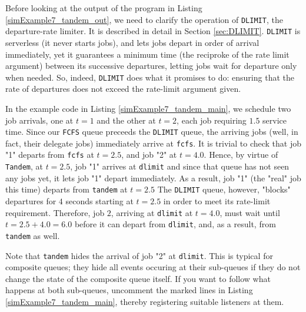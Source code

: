 \documentclass[12pt]{book}
\begin{document}
Before looking at the output of the program in
  Listing \ref{simExample7_tandem_out},
  we need to clarify the operation of \lstinline|DLIMIT|,
  the departure-rate limiter.
It is described in detail in Section \ref{sec:DLIMIT}.
\lstinline|DLIMIT| is serverless (it never starts jobs),
  and lets jobs depart in order of arrival immediately,
  yet it guarantees a minimum time (the reciproke of the rate limit argument)
  between its successive departures,
  letting jobs wait for departure only when needed.
So, indeed, \lstinline|DLIMIT| does what it promises to do:
  ensuring that the rate of departures does not exceed the
  rate-limit argument given.

In the example code in Listing \ref{simExample7_tandem_main},
  we schedule two job arrivals,
  one at $t=1$ and the other at $t=2$,
  each job requiring $1.5$ service time.
Since our \lstinline|FCFS| queue preceeds the \lstinline|DLIMIT|
  queue, the arriving jobs (well, in fact, their delegate jobs)
  immediately arrive at \lstinline|fcfs|.
It is trivial to check that job "1"
  departs from \lstinline|fcfs| at $t=2.5$,
  and job "2" at $t=4.0$.
Hence,
  by virtue of \lstinline|Tandem|,
  at $t=2.5$,
  job "1" arrives at \lstinline|dlimit|
  and since that queue has not seen any jobs yet,
  it lets job "1" depart immediately.
As a result,
  job "1" (the "real" job this time)
  departs from \lstinline|tandem| at $t=2.5$
The \lstinline|DLIMIT| queue, however,
  "blocks" departures for $4$ seconds
  starting at $t=2.5$
  in order to meet its rate-limit requirement.
Therefore, job $2$, arriving at \lstinline|dlimit|
  at $t=4.0$,
  must wait until $t=2.5+4.0=6.0$ before
  it can depart from \lstinline|dlimit|,
  and, as a result, from \lstinline|tandem| as well.

Note that \lstinline|tandem| hides
  the arrival of job "2" at \lstinline|dlimit|.
This is typical for composite queues;
  they hide all events occuring at their sub-queues
  if they do not change the state of the
  composite queue itself.
If you want to follow what happens at both
  sub-queues,
  uncomment the marked lines
  in Listing \ref{simExample7_tandem_main},
  thereby registering suitable listeners at them.
\end{document}
